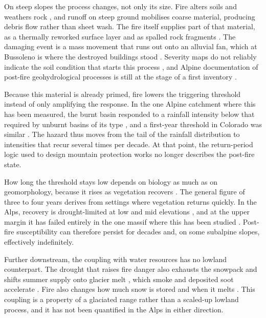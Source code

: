 \documentclass[11pt,a4paper]{article}
\begin{document}
On steep slopes the process changes, not only its size. Fire alters soils and weathers rock \citep{santi_wildfire_2022}, and runoff on steep ground mobilises coarse material, producing debris flow rather than sheet wash. The fire itself supplies part of that material, as a thermally reworked surface layer \citep{tiranti_wildfires_2021} and as spalled rock fragments \citep{pala_sediment_2025}. The damaging event is a mass movement that runs out onto an alluvial fan, which at Bussoleno is where the destroyed buildings stood \citep{laporta_postwildfire_2025}. Severity maps do not reliably indicate the soil condition that starts this process \citep{negri_wildfire_2026}, and Alpine documentation of post-fire geohydrological processes is still at the stage of a first inventory \citep{melzner_wildfire-induced_2025}.

Because this material is already primed, fire lowers the triggering threshold instead of only amplifying the response. In the one Alpine catchment where this has been measured, the burnt basin responded to a rainfall intensity below that required by unburnt basins of its type \citep{laporta_postwildfire_2025}, and a first-year threshold in Colorado was similar \citep{rengers_evaluating_2024}. The hazard thus moves from the tail of the rainfall distribution to intensities that recur several times per decade. At that point, the return-period logic used to design mountain protection works no longer describes the post-fire state.

How long the threshold stays low depends on biology as much as on geomorphology, because it rises as vegetation recovers \citep{rengers_evaluating_2024}. The general figure of three to four years \citep{santi_wildfire_2022} derives from settings where vegetation returns quickly. In the Alps, recovery is drought-limited at low and mid elevations \citep{moser_potential_2010}, and at the upper margin it has failed entirely in the one massif where this has been studied \citep{degiuli_arrested_2024}. Post-fire susceptibility can therefore persist for decades \citep{gehring_shallow_2019} and, on some subalpine slopes, effectively indefinitely.

Further downstream, the coupling with water resources has no lowland counterpart. The drought that raises fire danger also exhausts the snowpack and shifts summer supply onto glacier melt \citep{leone_20222023_2026}, which smoke and deposited soot accelerate \citep{aubrywake_fire_2022}. Fire also changes how much snow is stored and when it melts \citep{koshkin_wildfire_2022, micheletty_application_2014}. This coupling is a property of a glaciated range rather than a scaled-up lowland process, and it has not been quantified in the Alps in either direction.
\end{document}
